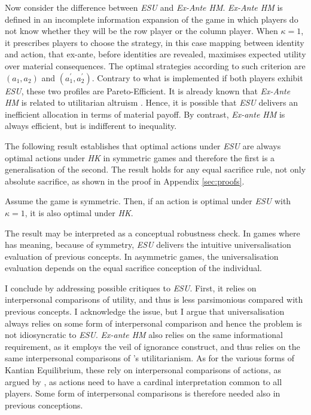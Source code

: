 Now consider the difference between \textit{ESU} and \textit{Ex-Ante HM}. \textit{Ex-Ante HM} is defined in an incomplete information expansion of the game in which players do not know whether they will be the row player or the column player. When \(\kappa = 1\), it prescribes players to choose the strategy, in this case mapping between identity and action, that ex-ante, before identities are revealed, maximises expected utility over material consequences. The optimal strategies according to such criterion are \((a_1,a_2 )\) and \((a_1^{\prime}, a_2^{\prime} )\). Contrary to what is implemented if both players exhibit \textit{ESU}, these two profiles are Pareto-Efficient. It is already known that \textit{Ex-Ante HM} is related to utilitarian altruism \citep{laslierUniversalizationAltruism2022}. Hence, it is possible that \textit{ESU} delivers an inefficient allocation in terms of material payoff. By contrast, \textit{Ex-ante HM} is always efficient, but is indifferent to inequality.

The following result establishes that optimal actions under \textit{ESU} are always optimal actions under \textit{HK} in symmetric games and therefore the first is a generalisation of the second. The result holds for any equal sacrifice rule, not only absolute sacrifice, as shown in the proof in Appendix \ref{sec:proofs}.

\begin{prop}\label{prop:equivalent}
	Assume the game is symmetric. Then, if an action is optimal under \textit{ESU} with \( \kappa = 1 \), it is also optimal under \textit{HK}.
\end{prop}

The result may be interpreted as a conceptual robustness check. In games where  has meaning, because of symmetry, \textit{ESU} delivers the intuitive universalisation evaluation of previous concepts. In asymmetric games, the universalisation evaluation depends on the equal sacrifice conception of the individual.

I conclude by addressing possible critiques to \textit{ESU}. First, it relies on interpersonal comparisons of utility, and thus is less parsimonious compared with previous concepts. I acknowledge the issue, but I argue that universalisation always relies on some form of interpersonal comparison and hence the problem is not idiosyncratic to \textit{ESU}. \textit{Ex-ante HM} also relies on the same informational requirement, as it employs the veil of ignorance construct, and thus relies on the same interpersonal comparisons of \citeauthor{harsanyiCardinalUtilityWelfare1953}'s utilitarianism. As for the various forms of Kantian Equilibrium, these rely on interpersonal comparisons of actions, as argued by \cite{sherNormativeAspectsKantian2020}, as actions need to have a cardinal interpretation common to all players. Some form of interpersonal comparisons is therefore needed also in previous conceptions.

